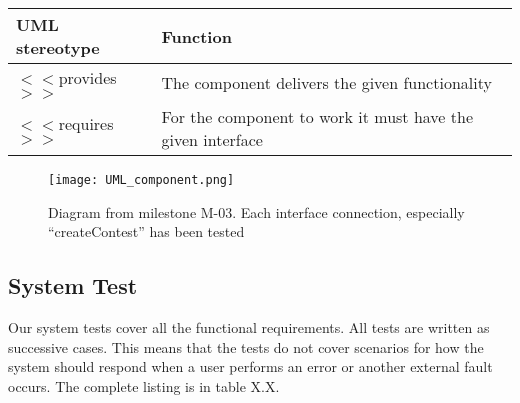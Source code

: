 \begin{longtable}{|l|p{}|}
    \hline
    \textbf{UML stereotype} & \textbf{Function}\\
    \hline

    $<<$provides$>>$ & The component delivers the given functionality \\
    \hline

    $<<$requires$>>$& For the component to work it must have the given interface\\
        \hline
    \end{longtable}

    \begin{figure}[h!]
        \texttt{[image: UML\_component.png]}
        \caption{Diagram from milestone M-03. Each interface connection, especially
        ``createContest'' has been tested}
\end{figure}

\subsection{System Test}
Our system tests cover all the functional requirements. All tests are
written as successive cases. This means that the tests do not cover
scenarios for how the system should respond when a user performs an
error or another external fault occurs. The complete listing is in
table X.X.

